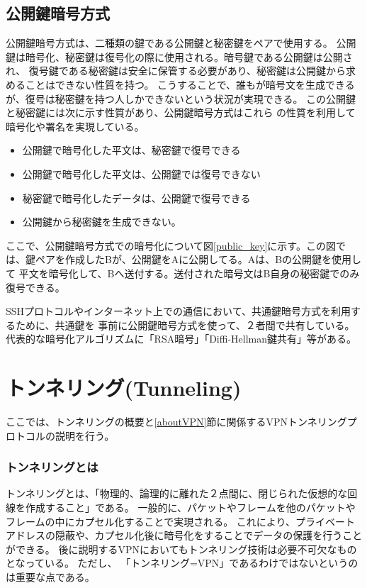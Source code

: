 \documentclass[11pt,a4j,titlepage]{jreport}
\begin{document}
\afterpage{\clearpage}
\newpage
\subsection{公開鍵暗号方式}
公開鍵暗号方式は、二種類の鍵である公開鍵と秘密鍵をペアで使用する。
公開鍵は暗号化、秘密鍵は復号化の際に使用される。暗号鍵である公開鍵は公開され、
復号鍵である秘密鍵は安全に保管する必要があり、秘密鍵は公開鍵から求めることはできない性質を持つ。
こうすることで、誰もが暗号文を生成できるが、復号は秘密鍵を持つ人しかできないという状況が実現できる。
この公開鍵と秘密鍵には次に示す性質があり、公開鍵暗号方式はこれら
の性質を利用して暗号化や署名を実現している。

\begin{itemize}
    \item 公開鍵で暗号化した平文は、秘密鍵で復号できる
    \item 公開鍵で暗号化した平文は、公開鍵では復号できない
    \item 秘密鍵で暗号化したデータは、公開鍵で復号できる
    \item 公開鍵から秘密鍵を生成できない。
\end{itemize}
\fi

ここで、公開鍵暗号方式での暗号化について図\ref{public_key}に示す。この図では、鍵ペアを作成したBが、公開鍵をAに公開してる。Aは、Bの公開鍵を使用して
平文を暗号化して、Bへ送付する。送付された暗号文はB自身の秘密鍵でのみ復号できる。

SSHプロトコルやインターネット上での通信において、共通鍵暗号方式を利用するために、共通鍵を
事前に公開鍵暗号方式を使って、２者間で共有している。
代表的な暗号化アルゴリズムに「RSA暗号」「Diffi-Hellman鍵共有」等がある。

\section{トンネリング(Tunneling)}\label{Tunnel}
ここでは、トンネリングの概要と\ref{aboutVPN}節に関係するVPNトンネリングプロトコルの説明を行う。

\subsubsection*{トンネリングとは}
トンネリングとは、「物理的、論理的に離れた２点間に、閉じられた仮想的な回線を作成すること」である。
一般的に、パケットやフレームを他のパケットやフレームの中にカプセル化することで実現される。
これにより、プライベートアドレスの隠蔽や、カプセル化後に暗号化をすることでデータの保護を行うことができる。
後に説明するVPNにおいてもトンネリング技術は必要不可欠なものとなっている。
ただし、
「トンネリング=VPN」であるわけではないというのは重要な点である。
\end{document}
